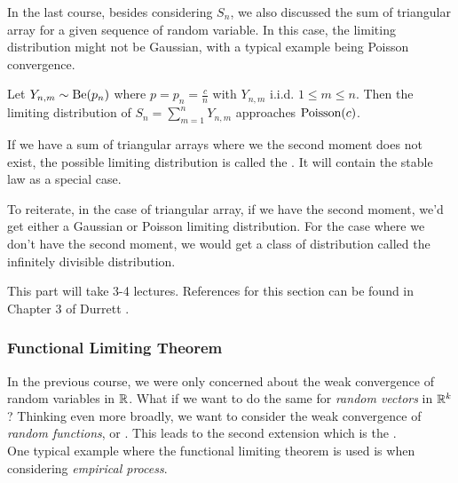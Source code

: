\documentclass[../main/main.tex]{subfiles}
\begin{document}
In the last course, besides considering $S_n$, we also discussed the sum of triangular array for a given sequence of random variable. In this case, the limiting distribution might not be Gaussian, with a typical example being Poisson convergence.

\begin{example}\label{2-8-p1}
	Let $Y_{n,m} \sim \text{Be}(p_n)$ where $p = p_n = \frac{c}{n}$ with $Y_{n,m}$ i.i.d. $1 \leq m \leq n$. Then the limiting distribution of $S_n = \sum\limits_{m=1}^{n}Y_{n,m}$ approaches $\text{Poisson}(c)$.
\end{example}

If we have a sum of triangular arrays where we the second moment does not exist, the possible limiting distribution is called the . It will contain the stable law as a special case.

To reiterate, in the case of triangular array, if we have the second moment, we'd get either a Gaussian or Poisson limiting distribution. For the case where we don't have the second moment, we would get a class of distribution called the infinitely divisible distribution.\\

\begin{remark}
	\noindent This part will take 3-4 lectures. References for this section can be found in Chapter 3 of Durrett \cite{Durrett19}.
\end{remark}


\subsubsection{Functional Limiting Theorem}
In the previous course, we were only concerned about the weak convergence of random variables in $\mathbb{R}$. What if we want to do the same for \textit{random vectors} in $\mathbb{R}^{k}$? Thinking even more broadly, we want to consider the weak convergence of \textit{random functions}, or . This leads to the second extension which is the .\\

One typical example where the functional limiting theorem is used is when considering \textit{empirical process}.
\end{document}
